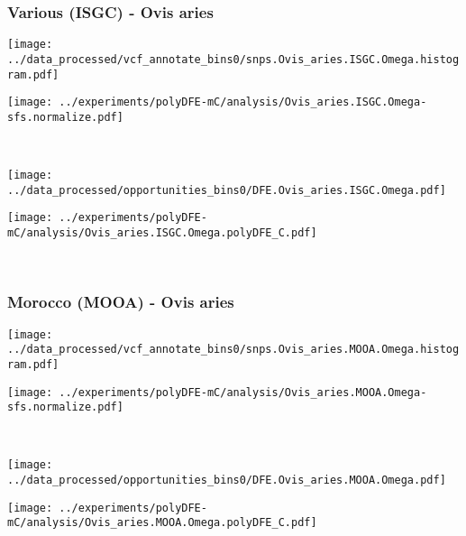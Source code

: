 \subsubsection{Various (ISGC) - Ovis aries}

\begin{minipage}{0.49\linewidth}
    \texttt{[image: ../data\_processed/vcf\_annotate\_bins0/snps.Ovis\_aries.ISGC.Omega.histogram.pdf]}
\end{minipage}
\begin{minipage}{0.49\linewidth}
    \texttt{[image: ../experiments/polyDFE-mC/analysis/Ovis\_aries.ISGC.Omega-sfs.normalize.pdf]}
\end{minipage}
\\
\begin{minipage}{0.49\linewidth}
    \texttt{[image: ../data\_processed/opportunities\_bins0/DFE.Ovis\_aries.ISGC.Omega.pdf]}
\end{minipage}
\begin{minipage}{0.49\linewidth}
    \texttt{[image: ../experiments/polyDFE-mC/analysis/Ovis\_aries.ISGC.Omega.polyDFE\_C.pdf]}
\end{minipage}
\\

\subsubsection{Morocco (MOOA) - Ovis aries}

\begin{minipage}{0.49\linewidth}
    \texttt{[image: ../data\_processed/vcf\_annotate\_bins0/snps.Ovis\_aries.MOOA.Omega.histogram.pdf]}
\end{minipage}
\begin{minipage}{0.49\linewidth}
    \texttt{[image: ../experiments/polyDFE-mC/analysis/Ovis\_aries.MOOA.Omega-sfs.normalize.pdf]}
\end{minipage}
\\
\begin{minipage}{0.49\linewidth}
    \texttt{[image: ../data\_processed/opportunities\_bins0/DFE.Ovis\_aries.MOOA.Omega.pdf]}
\end{minipage}
\begin{minipage}{0.49\linewidth}
    \texttt{[image: ../experiments/polyDFE-mC/analysis/Ovis\_aries.MOOA.Omega.polyDFE\_C.pdf]}
\end{minipage}
\\ 

